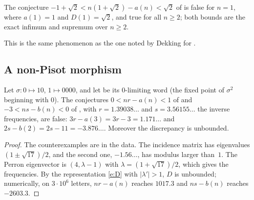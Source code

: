 \begin{proposition} The conjecture $-1+\sqrt2<n(1+\sqrt2)-a(n)<\sqrt2$ of  is false for $n=1$,
where $a(1)=1$ and $D(1)=\sqrt2$, and true for all $n\ge2$; both bounds are the exact infimum and supremum
over $n\ge2$.\end{proposition}
This is the same phenomenon as the one noted by Dekking for .

\subsection{A non-Pisot morphism}\label{s:A285126}
\begin{proposition} Let $\sigma:0\mapsto10$, $1\mapsto0000$, and let  be its $0$-limiting word
(the fixed point of $\sigma^2$ beginning with $0$). The conjectures $0<nr-a(n)<1$ of  and
$-3<ns-b(n)<0$ of , with $r=1.39038\ldots$ and $s=3.56155\ldots$ the inverse frequencies,
are false: $3r-a(3)=3r-3=1.171\ldots$ and $2s-b(2)=2s-11=-3.876\ldots$. Moreover the discrepancy is
unbounded.\end{proposition}
\begin{proof} The counterexamples are in the data. The incidence matrix has eigenvalues $(1\pm\sqrt{17})/2$,
and the second one, $-1.56\ldots$, has modulus larger than~$1$. The Perron eigenvector is
$(4,\lambda-1)$ with $\lambda=(1+\sqrt{17})/2$, which gives the frequencies. By the representation
\eqref{e:D} with $|\lambda'|>1$, $D$ is unbounded; numerically, on $3\cdot10^6$ letters, $nr-a(n)$ reaches
$1017.3$ and $ns-b(n)$ reaches $-2603.3$. \end{proof}

